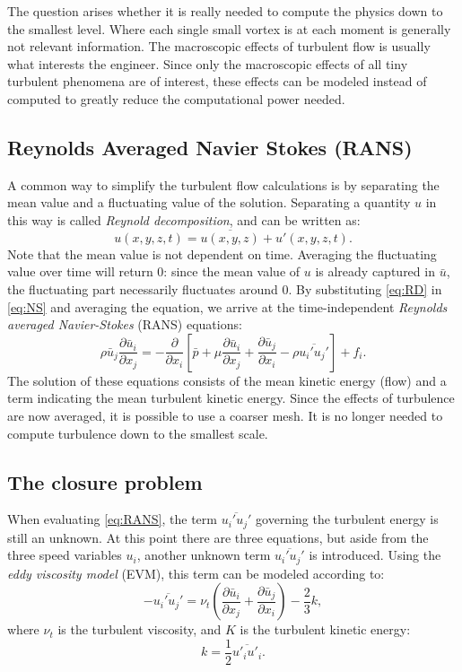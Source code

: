 The question arises whether it is really needed to compute the physics down to the smallest level. Where each single small vortex is at each moment is generally not relevant information. The macroscopic effects of turbulent flow is usually what interests the engineer. Since only the macroscopic effects of all tiny turbulent phenomena are of interest, these effects can be modeled instead of computed to greatly reduce the computational power needed. 

\subsection{Reynolds Averaged Navier Stokes (RANS)}
A common way to simplify the turbulent flow calculations is by separating the mean value and a fluctuating value of the solution. Separating a quantity $u$ in this way is called \emph{Reynold decomposition}, and can be written as:
\begin{equation}\label{eq:RD}
u(x,y,z,t) = \overline{u(x,y,z)}+u'(x,y,z,t).
\end{equation}
Note that the mean value is not dependent on time. Averaging the fluctuating value over time will return 0: since the mean value of $u$ is already captured in $\bar{u}$, the fluctuating part necessarily fluctuates around 0. By substituting \autoref{eq:RD} in \autoref{eq:NS} and averaging the equation, we arrive at the time-independent \emph{Reynolds averaged Navier-Stokes} (RANS) equations:
\begin{equation}\label{eq:RANS}
\rho \bar{u}_j \frac{\partial \bar{u}_i}{\partial x_j} = -\frac{\partial}{\partial x_i} \left[ \bar{p} + \mu \frac{\partial \bar{u}_i}{\partial x_j} + \frac{\partial \bar{u}_j}{\partial x_i} - \rho \overline{u_i'u_j'}\right] + f_i. 
\end{equation} 
The solution of these equations consists of the mean kinetic energy (flow) and a term indicating the mean turbulent kinetic energy. Since the effects of turbulence are now averaged, it is possible to use a coarser mesh. It is no longer needed to compute turbulence down to the smallest scale. 

\subsection{The closure problem}
When evaluating \autoref{eq:RANS}, the term $\overline{u_i'u_j'}$ governing the turbulent energy is still an unknown. At this point there are three equations, but aside from the three speed variables $u_i$, another unknown term $\overline{u_i'u_j'}$ is introduced. Using the \emph{eddy viscosity model} (EVM), this term can be modeled according to:
\begin{equation}\label{eq:EVM}
-\overline{u_i'u_j'}=\nu_t\left(\frac{\partial \bar{u}_i}{\partial x_j} + \frac{\partial \bar{u}_j}{\partial x_i} \right) - \frac{2}{3}k,
\end{equation}
where $\nu_t$ is the turbulent viscosity, and $K$ is the turbulent kinetic energy:
\begin{equation}\label{eq:k}
k = \frac{1}{2}\overline{u'_iu'_i}.
\end{equation}

